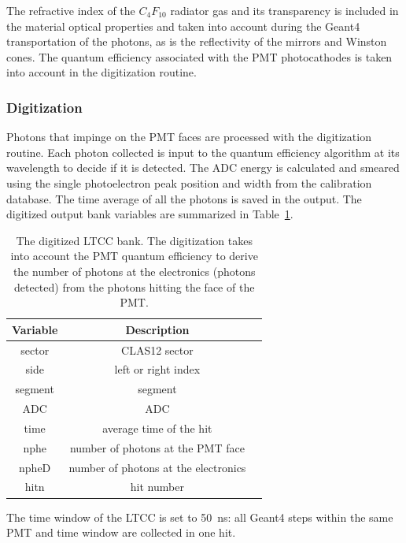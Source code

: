The refractive index of the $C_4F_{10}$ radiator gas and its transparency is included in the material optical properties
and taken into account during the Geant4 transportation of the photons, as is the reflectivity of the mirrors and Winston
cones. The quantum efficiency associated with the PMT photocathodes is taken into account in the digitization routine.

\subsubsection{Digitization}

Photons that impinge on the PMT faces are processed with the digitization routine. Each photon collected is input to the
quantum efficiency algorithm at its wavelength to decide if it is detected. The ADC energy is calculated and smeared
using the single photoelectron peak position and width from the calibration database. The time average of all the photons
is saved in the output. The digitized output bank variables are summarized in Table~\ref{tab:ltccBank}.

\begin{table}[h]
	\begin{center}
		\begin{tabular}{| c | c | c |}
			\hline \hline
			Variable & Description                                         \\
			\hline
             sector  &                                     CLAS12 sector     \\
               side  &                               left or right index     \\
            segment  &                                           segment     \\
                ADC  &                                               ADC     \\
               time  &                           average time of the hit     \\
               nphe  &                 number of photons at the PMT face     \\
              npheD  &              number of photons at the electronics     \\
               hitn  &                                        hit number     \\
			\hline \hline
		\end{tabular}
	\end{center}
	\caption{The digitized LTCC bank. The digitization takes into account the PMT quantum efficiency
             to derive the number of photons at the electronics (photons detected) from the photons
             hitting the face of the PMT.}
        \label{tab:ltccBank}
\end{table}

The time window  of the LTCC is set to 50~ns: all Geant4 steps within the same PMT and time window are collected
in one hit.
